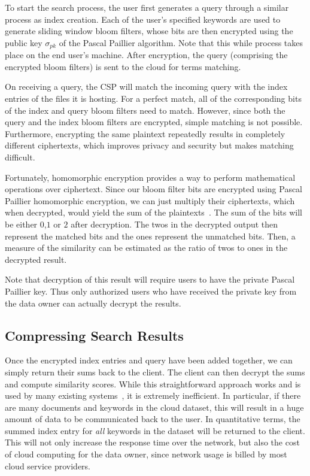 To start the search process, the user first generates a query through a similar process as index creation. 
Each of the user's specified keywords are used to generate sliding window bloom filters, whose bits are then
encrypted using the public key $\sigma_{pk}$ of the Pascal Paillier algorithm. 
Note that this while process takes place on the end user's machine. After encryption, 
the query (comprising the encrypted bloom filters) is sent to the cloud for terms matching.

On receiving a query, the CSP will match the incoming query with the index entries of 
the files it is hosting. For a perfect match, all of the corresponding bits of the index 
and query bloom filters need to match. However, since both the query and the index
bloom filters are encrypted, simple matching is not possible. Furthermore, encrypting the
same plaintext repeatedly results in completely different ciphertexts, which improves
privacy and security but makes matching difficult.

Fortunately, homomorphic encryption provides a way to perform mathematical operations 
over ciphertext. Since our bloom filter bits are encrypted using Pascal Paillier homomorphic
encryption, we can just multiply their ciphertexts, which when decrypted, would yield the sum of
the plaintexts~\cite{pascal}. The sum of the bits will be either $0$,$1$ or $2$ after decryption.
The twos in the decrypted output then represent the matched
bits and the ones represent the unmatched bits. Then, a measure of the similarity
can be estimated as the ratio of twos to ones in the decrypted result.

Note that decryption of this result will require users to have the private Pascal 
Paillier key. Thus only authorized users who have received the private key from the
data owner can actually decrypt the results.

\subsection{Compressing Search Results}

Once the encrypted index entries and query have been added together, 
we can simply return their sums back to the client. The client can then decrypt the
sums and compute similarity scores. While this straightforward approach works and
is used by many existing systems~\cite{zeehan}, it is extremely inefficient. In
particular, if there are many documents and keywords in the cloud dataset, this
will result in a huge amount of data to be communicated back to the user. In quantitative terms,
the summed index entry for \textit{all} keywords in the dataset will be returned
to the client. This will not only increase the response time over the network, but
also the cost of cloud computing for the data owner, since network usage is billed
by most cloud service providers.

